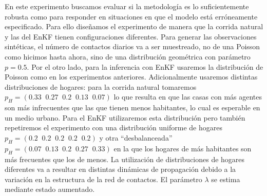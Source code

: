 En este experimento buscamos evaluar si la metodología es lo suficientemente robusta como para responder en situaciones en que el modelo está erróneamente especificado. Para ello diseñamos el experimento de manera que la corrida natural y las del EnKF tienen configuraciones diferentes. Para generar las observaciones sintéticas, el número de contactos diarios va a ser muestreado, no de una Poisson como hicimos hasta ahora, sino de una distribución geométrica con parámetro $p = 0.5$. Por el otro lado, para la inferencia con EnKF usaremos la distribución de Poisson como en los experimentos anteriores. Adicionalmente usaremos distintas distribuciones de hogares: para la corrida natural tomaremos $p_H = (0.33\;\; 0.27\;\; 0.2\;\; 0.13\;\; 0.07)$ lo que resulta en que las casas con más agentes son más infrecuentes que las que tienen menos habitantes, lo cual es esperable en un medio urbano. Para el EnKF utilizaremos esta distribución pero también repetiremos el experimento con una distribución uniforme de hogares $p_H = (0.2\;\; 0.2\;\; 0.2\;\; 0.2\;\; 0.2)$ y otra ``desbalanceada'' $p_H = (0.07\;\; 0.13\;\; 0.2\;\; 0.27\;\; 0.33)$ en la que los hogares de más habitantes son más frecuentes que los de menos. La utilización de distribuciones de hogares diferentes va a resultar en distintas dinámicas de propagación debido a la variación en la estructura de la red de contactos. El parámetro $\lambda$ se estima mediante estado aumentado.

